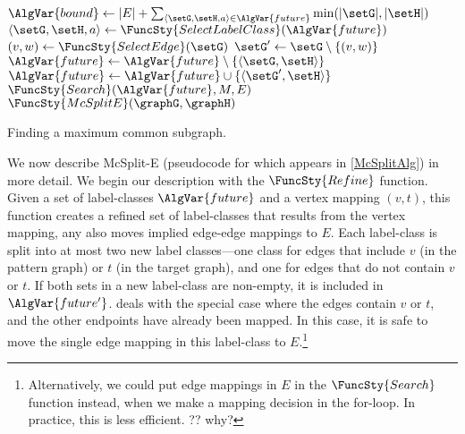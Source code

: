 \begin{algorithm}[htb]
{\nl {} \label{StoreIncumbent}
\medskip
\nl $\AlgVar{bound} \gets |E|  + \sum_{\langle \setG,\setH,a \rangle \in \AlgVar{future}} \min(|\setG|,|\setH|)$ \label{CalcBound} \;
\nl {} \label{PruneSearch}
\medskip
\nl $\langle \setG,\setH,a \rangle \gets \FuncSty{SelectLabelClass}(\AlgVar{future})$ \label{SelectClass} \;
\nl $(v,w) \gets \FuncSty{SelectEdge}(\setG)$ \label{SelectEdge} \;
\nl {} {
\nl    {} 
  }
\nl $\setG' \gets \setG \setminus \{(v,w)\}$ \label{RemoveVW} \;
\nl $\AlgVar{future} \gets \AlgVar{future} \setminus \{\langle \setG,\setH \rangle\}$\;
\nl {} {$\AlgVar{future} \gets \AlgVar{future} \cup \{\langle \setG',\setH \rangle \}$}
\nl $\FuncSty{Search}(\AlgVar{future},M,E)$ \label{ExpandWithoutVW} \;
}
\;
\nl $\FuncSty{McSplitE}(\graphG,\graphH)$ \label{McSplitFun} \;
\nl {}
\caption{Finding a maximum common subgraph.}
\label{McSplitAlg}
\end{algorithm}

We now describe McSplit-E (pseudocode for which appears in \cref{McSplitAlg})
in more detail.
We begin our description with the $\FuncSty{Refine}$ function.  Given a set of label-classes
$\AlgVar{future}$ and a vertex mapping $(v,t)$, this function
creates a refined set of label-classes that results from the vertex mapping,
any also moves implied edge-edge mappings to $E$.  Each label-class is split into at most
two new label classes---one class for edges that include $v$ (in the pattern graph) or $t$
(in the target graph), and one for edges that do not contain $v$ or $t$.  If both sets in a new
label-class are non-empty, it is included in $\AlgVar{future'}$.   deals with the
special case where the edges contain $v$ or $t$, and the other endpoints have already been mapped.
In this case, it is safe to move the single edge mapping in this label-class to $E$.\footnote{Alternatively,
we could put edge mappings in $E$ in the $\FuncSty{Search}$ function instead, when we make a mapping decision
in the for-loop.  In practice, this is less efficient.  ?? why?}

